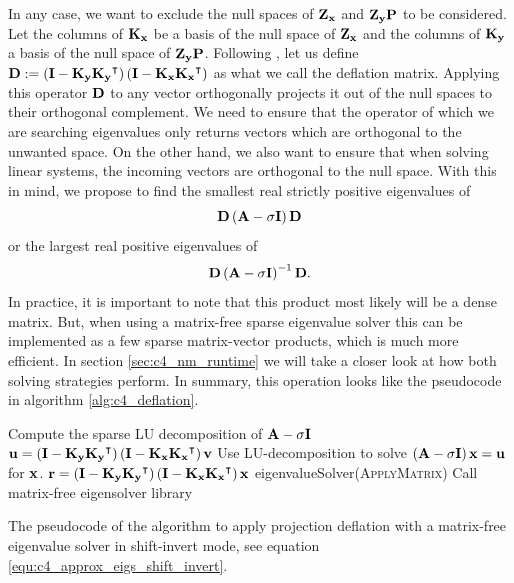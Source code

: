 In any case, we want to exclude the null spaces of $\vb{Z_x}$ and $\vb{Z_y} \vb{P}$ to be considered. Let the columns of $\vb{K_x}$ be a basis of the null space of $\vb{Z_x}$ and the columns of $\vb{K_y}$ a basis of the null space of $\vb{Z_y}\vb{P}$. Following \cite{saad_numerical_2011,mackey_deflation_2008}, let us define $\vb{D} := \left(\vb{I} - \vb{K_y} \vb{K_y}^\intercal\right) \left(\vb{I} - \vb{K_x} \vb{K_x}^\intercal\right)$ as what we call the deflation matrix. Applying this operator $\vb{D}$ to any vector orthogonally projects it out of the null spaces to their orthogonal complement. We need to ensure that the operator of which we are searching eigenvalues only returns vectors which are orthogonal to the unwanted space. On the other hand, we also want to ensure that when solving linear systems, the incoming vectors are orthogonal to the null space. With this in mind, we propose to find the smallest real strictly positive eigenvalues of
$$
    \vb{D} \left(\vb{A} - \sigma \vb{I}\right) \vb{D}
$$
or the largest real positive eigenvalues of
\begin{equation}\label{equ:c4_approx_eigs_shift_invert}
    \vb{D} \left(\vb{A} - \sigma \vb{I}\right)^{-1} \vb{D}\text{.}
\end{equation}
In practice, it is important to note that this product most likely will be a dense matrix. But, when using a matrix-free sparse eigenvalue solver this can be implemented as a few sparse matrix-vector products, which is much more efficient. In section \ref{sec:c4_nm_runtime} we will take a closer look at how both solving strategies perform. In summary, this operation looks like the pseudocode in algorithm \ref{alg:c4_deflation}.


\begin{algorithm}
    \begin{algorithmic}
        \State Compute the sparse LU decomposition of $\vb{A} - \sigma \vb{I}$
        \State
        \State $\vb{u} = \left(\vb{I} - \vb{K_y} \vb{K_y}^\intercal\right) \left(\vb{I} - \vb{K_x} \vb{K_x}^\intercal\right) \vb{v}$
        \State Use LU-decomposition to solve $\left(\vb{A} - \sigma \vb{I}\right) \vb{x} = \vb{u}$ for $\vb{x}$.
        \State $\vb{r} = \left(\vb{I} - \vb{K_y} \vb{K_y}^\intercal\right) \left(\vb{I} - \vb{K_x} \vb{K_x}^\intercal\right) \vb{x}$
        \EndFunction
        \State
        \State eigenvalueSolver(\textsc{ApplyMatrix}) \Comment Call matrix-free eigensolver library
    \end{algorithmic}
    \caption{The pseudocode of the algorithm to apply projection deflation with a matrix-free eigenvalue solver in shift-invert mode, see equation \eqref{equ:c4_approx_eigs_shift_invert}.}\label{alg:c4_deflation}
\end{algorithm}

